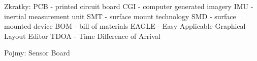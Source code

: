Zkratky:
PCB - printed circuit board
CGI - computer generated imagery
IMU - inertial measurement unit
SMT - surface mount technology
SMD - surface mounted device
BOM - bill of materials
EAGLE - Easy Applicable Graphical Layout Editor
TDOA - Time Difference of Arrival

Pojmy:
Sensor Board